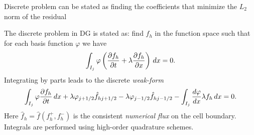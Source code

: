 \documentclass[pdf]{beamer}
\newcommand{\pfrac}[2]{\frac{\partial #1}{\partial #2}}
\theoremstyle{definition}
\begin{document}
\begin{frame}{Discrete problem can be stated as finding the
    coefficients that minimize the $L_2$ norm of the residual}

  The discrete problem in DG is stated as: find $f_h$ in the function
  space such that for each basis function $\varphi$ we have
  \begin{align*}
    \int_{I_j} \varphi\left(
      \pfrac{f_h}{t} 
      + \lambda \pfrac{f_h}{x}
      \right)
    \thinspace dx = 0.
  \end{align*}
  Integrating by parts leads to the discrete \emph{weak-form}
  \begin{align*}
    \int_{I_j} \varphi \pfrac{f_h}{t}\thinspace dx
    +
    \lambda \varphi_{j+1/2}\hat{f}_{hj+1/2} - \lambda \varphi_{j-1/2}\hat{f}_{hj-1/2}
    -
    \int_{I_j}  \frac{d\varphi}{dx}\lambda f_h\thinspace dx = 0.
  \end{align*}
  Here $\hat{f}_{h} = \hat{f}(f^+_h,f^-_h)$ is the consistent
  \emph{numerical flux} on the cell boundary. Integrals are performed
  using high-order quadrature schemes.
  
\end{frame}
\end{document}
